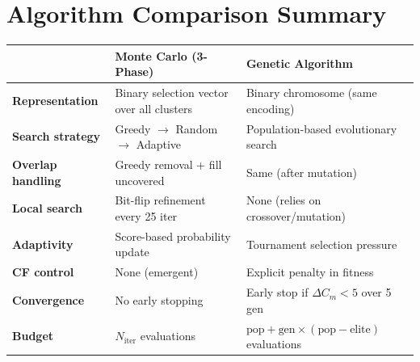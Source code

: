 \documentclass[11pt,a4paper]{article}
\begin{document}
\newpage
\section{Algorithm Comparison Summary}

\begin{center}
\renewcommand{\arraystretch}{1.3}
\begin{tabular}{p{3.5cm} p{5.5cm} p{5.5cm}}
\toprule
& \textbf{Monte Carlo (3-Phase)} & \textbf{Genetic Algorithm} \\
\midrule
\textbf{Representation} & Binary selection vector over all clusters
    & Binary chromosome (same encoding) \\
\textbf{Search strategy} & Greedy $\to$ Random $\to$ Adaptive
    & Population-based evolutionary search \\
\textbf{Overlap handling} & Greedy removal + fill uncovered
    & Same (after mutation) \\
\textbf{Local search} & Bit-flip refinement every 25 iter
    & None (relies on crossover/mutation) \\
\textbf{Adaptivity} & Score-based probability update
    & Tournament selection pressure \\
\textbf{CF control} & None (emergent)
    & Explicit penalty in fitness \\
\textbf{Convergence} & No early stopping
    & Early stop if $\Delta C_m < 5$ over 5 gen \\
\textbf{Budget} & $N_{\text{iter}}$ evaluations
    & $\text{pop} + \text{gen} \times (\text{pop} - \text{elite})$ evaluations \\
\bottomrule
\end{tabular}
\end{center}

\vspace{1em}
\end{document}
